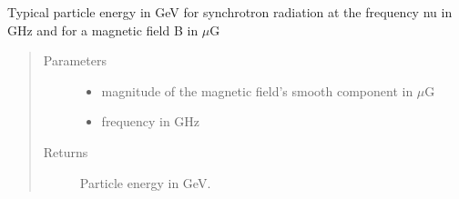 \documentclass[letterpaper,10pt,english]{sphinxmanual}
\begin{document}
\begin{fulllineitems}
\label{\detokenize{diffsph.spectra:diffsph.spectra.synchrotron.Enu}}
\sphinxAtStartPar
Typical particle energy in GeV for synchrotron radiation at the frequency nu in GHz and for a magnetic field B in \(\mu\)G
\begin{quote}\begin{description}
\item[{Parameters}] \leavevmode\begin{itemize}
\item {} 
\sphinxAtStartPar
{} \textendash{} magnitude of the magnetic field’s smooth component in \(\mu\)G

\item {} 
\sphinxAtStartPar
{} \textendash{} frequency in GHz

\end{itemize}

\item[{Returns}] \leavevmode
\sphinxAtStartPar
Particle energy in GeV.

\end{description}\end{quote}

\end{fulllineitems}

\end{document}
